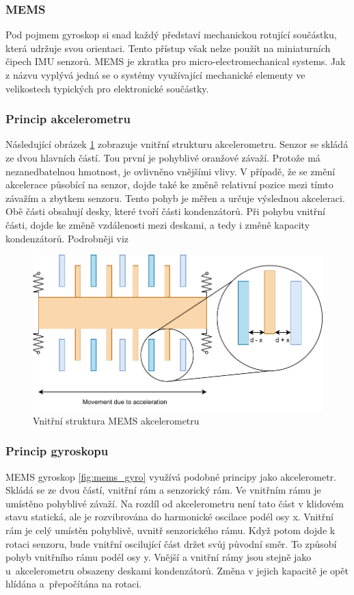 \subsubsection*{MEMS}
Pod pojmem gyroskop si snad každý představí mechanickou rotující součástku, která udržuje svou orientaci. Tento přístup však nelze použít na miniaturních čipech IMU senzorů. MEMS je zkratka pro micro-electromechanical systems. Jak z názvu vyplývá jedná se o systémy využívající mechanické elementy ve velikostech typických pro elektronické součástky.~\cite[str:~2-3]{mems_acc}

\subsubsection*{Princip akcelerometru}
Následující obrázek \ref{fig:mems_acc} zobrazuje vnitřní strukturu akcelerometru. Senzor se skládá ze dvou hlavních částí. Tou první je pohyblivé oranžové závaží. Protože má nezanedbatelnou hmotnost, je ovlivněno vnějšími vlivy. V případě, že se změní akcelerace působící na senzor, dojde také ke změně relativní pozice mezi tímto závažím a zbytkem senzoru. Tento pohyb je měřen a určuje výslednou akceleraci. Obě části obsahují desky, které tvoří části kondenzátorů. Při pohybu vnitřní části, dojde ke změně vzdálenosti mezi deskami, a tedy i změně kapacity kondenzátorů. Podrobněji viz \cite[str:~4-5]{mems_acc}

\begin{figure}[h!]
	\centering
	\includegraphics[scale=0.8]{obrazky-figures/accelerometer.pdf}
	\caption{Vnitřní struktura MEMS akcelerometru}
	\label{fig:mems_acc}
\end{figure}

\subsubsection{Princip gyroskopu}
MEMS gyroskop \ref{fig:mems_gyro} využívá podobné principy jako akcelerometr. Skládá se ze dvou částí, vnitřní rám a senzorický rám. Ve vnitřním rámu je umístěno pohyblivé závaží. Na rozdíl od akcelerometru není tato část v klidovém stavu statická, ale je rozvibrována do harmonické oscilace podél osy x.
Vnitřní rám je celý umístěn pohyblivě, uvnitř senzorického rámu. Když potom dojde k rotaci senzoru, bude vnitřní oscilující část držet svůj původní směr. To způsobí pohyb vnitřního rámu podél osy y. Vnější a vnitřní rámy jsou stejně jako u~akcelerometru obsazeny deskami kondenzátorů. Změna v jejich kapacitě je opět hlídána a~přepočítána na rotaci. \cite{mems_gyro}


